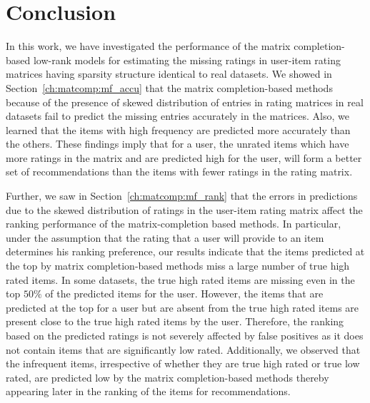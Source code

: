 \section{Conclusion} \label{ch:matcomp:conclusion}


In this work, we have investigated the performance of the matrix
completion-based low-rank models for estimating the missing ratings
in  user-item rating matrices having sparsity structure identical 
to real datasets. We showed in
Section~\ref{ch:matcomp:mf_accu} that the matrix completion-based methods because of the
presence of skewed distribution of entries in rating matrices in real
datasets fail to predict the missing entries accurately in the matrices. Also,
we learned that the items with high frequency are predicted more accurately than
the others. These findings imply that for a user, the unrated items which have more ratings 
in the matrix and are predicted high for the user, will form a better set of recommendations 
than the items with fewer ratings in the rating matrix.


Further, we saw in Section~\ref{ch:matcomp:mf_rank} that the errors in predictions due to
the skewed distribution of ratings in the user-item rating matrix 
affect the ranking performance of the matrix-completion based methods.
In particular, under the assumption that the rating that a user will provide to an item determines his
ranking preference, our results indicate that the items predicted at the top by matrix completion-based
methods miss a large number of true high rated items. In some datasets, the true
high rated items are missing even in the top $50\%$ of the predicted items for
the user.
However, the items that are predicted at the top for a user but are absent from
the true high rated items are present close to the true high rated items by the
user. Therefore, the ranking based on the predicted ratings is not severely
affected by false positives as it does not contain items that are significantly
low rated.
Additionally, we observed that the infrequent items, irrespective of whether 
they are true high rated or true low rated, are predicted low by the matrix
completion-based methods thereby appearing later in the ranking
of the items for recommendations.

\iffalse
We can further use these findings to improve existing matrix completion-based recommendation methods.
Also, it will be interesting to investigate how 
properties of ratings, e.g., diversity of the ratings, in the rating matrix
affect the matrix completion-based recommendation methods.
\fi

